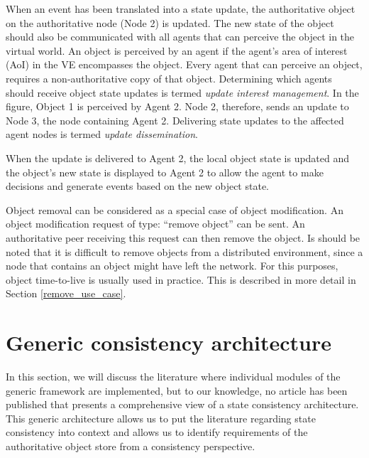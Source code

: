 When an event has been translated into a state update, the authoritative object on the authoritative node (Node 2) is updated. The new state of the object should also be communicated with all agents that can perceive the object in the virtual world. An object is perceived by an agent if the agent's area of interest (AoI)  in the VE encompasses the object. Every agent that can perceive an object, requires a non-authoritative copy of that object. Determining which agents should receive object state updates is termed \emph{update interest management}. In the figure, Object 1 is perceived by Agent 2. Node 2, therefore, sends an update to Node 3, the node containing Agent 2. Delivering state updates to the affected agent nodes is termed \emph{update dissemination}.

When the update is delivered to Agent 2, the local object state is updated and the object's new state is displayed to Agent 2 to allow the agent to make decisions and generate events based on the new object state.

Object removal can be considered as a special case of object modification. An object modification request of type: ``remove object'' can be sent. An authoritative peer receiving this request can then remove the object. Is should be noted that it is difficult to remove objects from a distributed environment, since a node that contains an object might have left the network. For this purposes, object time-to-live is usually used in practice. This is described in more detail in Section \ref{remove_use_case}.

\section{Generic consistency architecture}
\label{generic_event_update_model}

In this section, we will discuss the literature where individual modules of the generic framework are implemented, but to our knowledge, no article has been published that presents a comprehensive view of a state consistency architecture. This generic architecture allows us to put the literature regarding state consistency into context and allows us to identify requirements of the authoritative object store from a consistency perspective.

